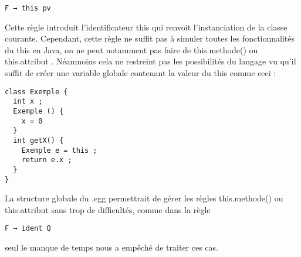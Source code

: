 \begin{verbatim}
F → this pv
\end{verbatim}

Cette règle introduit l'identificateur this qui renvoit l'instanciation de la
classe courante. Cependant, cette règle ne suffit pas à simuler toutes les
fonctionnalités du this en Java, on ne peut notamment pas faire de
this.methode() ou this.attribut . Néanmoins cela ne restreint pas les
possibilités du langage vu qu'il suffit de créer une variable globale contenant
la valeur du this comme ceci :\\

\begin{verbatim}
class Exemple {
  int x ;
  Exemple () {
    x = 0
  }
  int getX() {
    Exemple e = this ;
    return e.x ;
  }
}
\end{verbatim}

La structure globale du .egg permettrait de gérer les règles this.methode() ou
this.attribut sans trop de difficultés, comme dans la règle 
\begin{verbatim}
F → ident Q 
\end{verbatim}
seul le manque de temps nous a empêché
de traiter ces cas.\\



